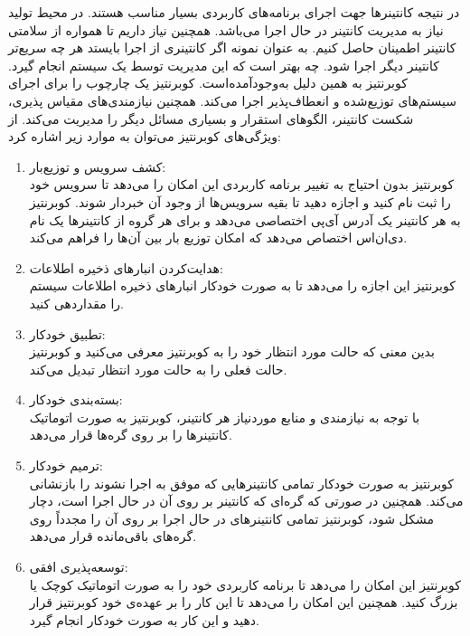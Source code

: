 در نتیجه کانتینرها جهت اجرای برنامه‌های کاربردی بسیار مناسب هستند. در محیط تولید نیاز به مدیریت کانتینر در حال اجرا می‌باشد. همچنین نیاز داریم تا همواره از سلامتی کانتینر اطمینان حاصل کنیم. به عنوان نمونه اگر کانتینری از اجرا بایستد هر چه سریع‌تر کانتینر دیگر اجرا شود. چه بهتر است که این مدیریت توسط یک سیستم انجام گیرد. کوبرنتیز به همین دلیل به‌وجود‌آمده‌است. کوبرنتیز یک چارچوب را برای اجرای سیستم‌های توزیع‌شده و انعطاف‌پذیر اجرا می‌کند. همچنین نیازمندی‌های مقیاس پذیری، شکست کانتینر، الگوهای استقرار و بسیاری مسائل دیگر را مدیریت می‌کند. 
\newline
\newline
از ویژگی‌های کوبرنتیز می‌توان به موارد زیر اشاره کرد:
\begin{enumerate}
	\item 
	کشف سرویس و توزیع‌بار:\\
	کوبرنتیز بدون احتیاج به تغییر برنامه کاربردی این امکان را می‌دهد تا سرویس خود را ثبت نام کنید و اجازه دهید تا بقیه سرویس‌ها از وجود آن خبردار شوند. کوبرنتیز به هر کانتینر یک آدرس آی‌پی اختصاصی می‌دهد و برای هر گروه از کانتینرها یک نام دی‌ان‌اس اختصاص می‌دهد که امکان توزیع بار بین آن‌ها را فراهم می‌کند.
	\item 
	هدایت‌کردن انبارهای ذخیره اطلاعات:\\
	کوبرنتیز این اجازه را می‌دهد تا به صورت خودکار انبارهای ذخیره اطلاعات سیستم را مقداردهی کنید.
	\item 
	تطبیق خودکار:\\
	بدین معنی که حالت مورد انتظار خود را به کوبرنتیز معرفی می‌کنید و کوبرنتیز حالت فعلی را به حالت مورد انتظار تبدیل می‌کند.
	
	\item
	بسته‌بندی خودکار:\\
	با توجه به نیازمندی و منابع مورد‌نیاز هر کانتینر، کوبرنتیز به صورت اتوماتیک کانتینرها را بر روی گره‌ها قرار می‌دهد.
	\item
	ترمیم خودکار:\\
	کوبرنتیز به صورت خودکار تمامی کانتینرهایی که موفق به اجرا نشوند را بازنشانی می‌کند. همچنین در صورتی که گره‌ای که کانتینر بر روی آن در حال اجرا است، دچار مشکل شود، کوبرنتیز تمامی کانتینرهای در حال اجرا بر روی آن را مجدداً روی گره‌های باقی‌مانده قرار می‌دهد.
	\item
	توسعه‌پذیری افقی:\\
	کوبرنتیز این امکان را می‌دهد تا برنامه کاربردی خود را به صورت اتوماتیک کوچک یا بزرگ کنید. همچنین این امکان را می‌دهد تا این کار را بر عهده‌ی خود کوبرنتیز قرار دهید و این کار به صورت خودکار انجام گیرد.
	

\end{enumerate}

